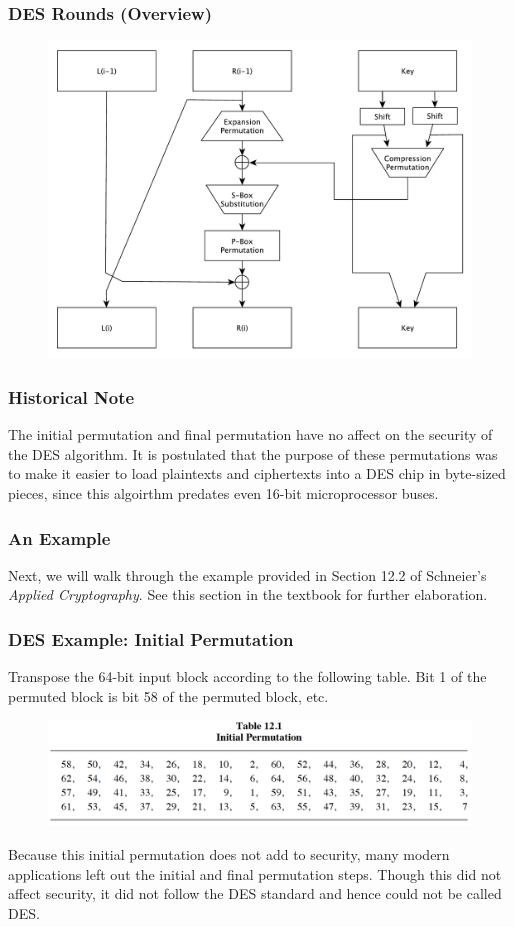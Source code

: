 \documentclass{beamer}
\newcommand{\<}{\langle}
\renewcommand{\>}{\rangle}
\begin{document}
\begin{frame}
\frametitle{DES Rounds (Overview)}
\begin{figure}
\includegraphics[scale=.4]{IMG/DESround}
\end{figure}
\end{frame}


\begin{frame}
\frametitle{Historical Note}

The initial permutation and final permutation have no affect on the security of the DES algorithm. It is postulated that the purpose of these permutations was to make it easier to load plaintexts and ciphertexts into a DES chip in byte-sized pieces, since this algoirthm predates even 16-bit microprocessor buses. 
\end{frame}

\begin{frame}
\frametitle{An Example}

Next, we will walk through the example provided in Section 12.2 of Schneier's \emph{Applied Cryptography}. See this section in the textbook for further elaboration. 
\end{frame}


\begin{frame}
\frametitle{DES Example: Initial Permutation}

Transpose the 64-bit input block according to the following table. Bit 1 of the permuted block is bit 58 of the permuted block, etc. 
\begin{figure}
\includegraphics[scale=.5]{IMG/ex1}
\end{figure}

Because this initial permutation does not add to security, many modern applications left out the initial and final permutation steps. Though this did not affect security, it did not follow the DES standard and hence could not be called DES.
\end{frame}
\end{document}
